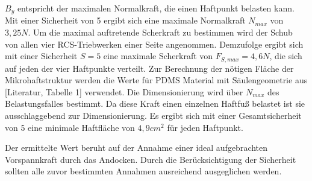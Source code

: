 $B_y$ entspricht der maximalen Normalkraft, die einen Haftpunkt belasten kann. Mit einer Sicherheit von 5 ergibt sich eine maximale Normalkraft $N_{max}$ von $3,25 N$. Um die maximal auftretende Scherkraft zu bestimmen wird der Schub von allen vier RCS-Triebwerken einer Seite angenommen. Demzufolge ergibt sich mit einer Sicherheit $S = 5$ eine maximale Scherkraft von $F_{S, max} = 4,6 N$, die sich auf jeden der vier Haftpunkte verteilt. Zur Berechnung der nötigen Fläche der Mikrohaftstruktur werden die Werte für PDMS Material mit Säulengeometrie aus [Literatur, Tabelle 1] verwendet. Die Dimensionierung wird über $N_{max}$ des Belastungsfalles bestimmt. Da diese Kraft einen einzelnen Haftfuß belastet ist sie ausschlaggebend zur Dimensionierung. Es ergibt sich mit einer Gesamtsicherheit von 5 eine minimale Haftfläche von $4,9 cm^{2}$ für jeden Haftpunkt.

Der ermittelte Wert beruht auf der Annahme einer ideal aufgebrachten Vorspannkraft durch das Andocken. Durch die Berücksichtigung der Sicherheit sollten alle zuvor bestimmten Annahmen ausreichend ausgeglichen werden. 




		
